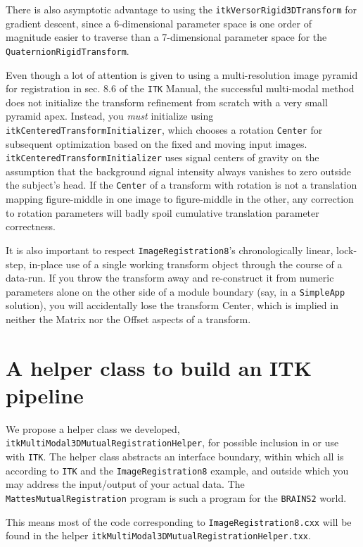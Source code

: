 \documentclass [10pt,twocolumn,twoside,final,letterpaper]{report}
\newcommand{\bcode}{\texttt}
\newcommand{\brainstwoprog}{\bcode{BRAINS2}}
\newcommand{\miregprog}{\bcode{MattesMutualRegistration}}
\begin{document}
There is also asymptotic advantage to using the \bcode{itkVersorRigid3DTransform}
for gradient descent, since a 6-dimensional parameter space is one order of
magnitude easier to traverse than a 7-dimensional parameter space 
for the \bcode{QuaternionRigidTransform}.

Even though a lot of attention is given to using a multi-resolution image
pyramid for registration in sec. 8.6 of the \bcode{ITK} Manual, the successful
multi-modal method does not initialize the transform refinement
from scratch with a very small pyramid apex.
Instead, you \emph{must} initialize using \bcode{itkCenteredTransformInitializer},
which chooses a rotation \bcode{Center} for subsequent optimization based on 
the fixed and moving input images.
\bcode{itkCenteredTransformInitializer} uses signal centers of gravity on the assumption that
the background signal intensity always vanishes to zero outside the subject's head.
If the \bcode{Center} of a transform with rotation is not a translation mapping 
figure-middle in one image to figure-middle in the other,
any correction to rotation parameters will badly spoil 
cumulative translation parameter correctness.

It is also important to respect \bcode{ImageRegistration8}'s chronologically linear,
lock-step, in-place use of a single working transform object through the course
of a data-run.  If you throw the transform away and re-construct
it from numeric parameters alone on the other side of a module boundary 
(say, in a \bcode{SimpleApp} solution),
you will accidentally lose the transform Center, which is
implied in neither the Matrix nor the Offset aspects of a transform.

\section{A helper class to build an ITK pipeline}
We propose a helper class we developed, \bcode{itkMultiModal3DMutualRegistrationHelper},
for possible inclusion in or use with \bcode{ITK}.  The helper class abstracts an interface boundary,
within which all is according to \bcode{ITK} and the \bcode{ImageRegistration8}
example, and outside which you may address the input/output of your actual data.
The \miregprog{} program is such a program for the \brainstwoprog{} world.

This means most of the code corresponding to \bcode{ImageRegistration8.cxx}
will be found in the helper \bcode{itkMultiModal3DMutualRegistrationHelper.txx}.
\end{document}
